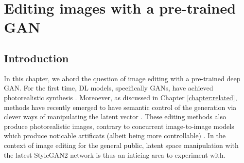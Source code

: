 \chapter{Editing images with a pre-trained GAN}
\label{chapter:magec}

\newpage
\minitoc

\newcommand{\tableindent}{\,\,\,\,}
\newcommand{\vt}{\mathbf{t}}
\newcommand{\std}{$\pm\,$}
\newcommand{\clf}{\textit{clf}} \newcommand{\gray}[1]{{\color{darkgray}#1}}











\section{Introduction}

In this chapter, we abord the question of image editing with a pre-trained deep \ac{GAN}.
For the first time, \ac{DL} models, specifically \ac{GAN}s, have achieved photorealistic synthesis \citep{karras2018progressive, karra2019stylegan, karra2020stylegan2}.
Moreoever, as discussed in Chapter \ref{chapter:related}, methods have recently emerged to 
have semantic control of the generation via clever ways of manipulating the latent vector \citep{shen2020, abdal2020styleflow, harkonen2020ganspace, tewari2020stylerig, stylespace_analysis, zhuang2021enjoy, editing_style}.
 These editing methods also produce photorealistic images, contrary to concurrent image-to-image models which 
produce noticable artificats (albeit being more controllable) \citep{wang2018pix2pixHD, park2019gaugan}.
 In the context of image editing for the general public, latent space manipulation with the latest 
 StyleGAN2 network \citep{karra2020stylegan2}
is thus an inticing area to experiment with. 

